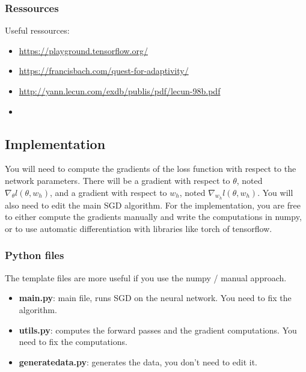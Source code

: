 \documentclass[
10pt, %
a4paper, %
oneside, %
headinclude,footinclude, %
BCOR5mm, %
]{scrartcl}
\begin{document}
\subsubsection{Ressources}%
\label{ssub:Ressources}

Useful ressources:
\begin{itemize}
\item 	\url{https://playground.tensorflow.org/}
\item \url{https://francisbach.com/quest-for-adaptivity/} 
    \item \url{http://yann.lecun.com/exdb/publis/pdf/lecun-98b.pdf} 
    \item \cite{LeCun2012}
\end{itemize}

\subsection{Implementation}%
\label{ssub:Implementation}

{\color{Blue}{Train neural networks with SGD (Stochastic gradient descent) with varying number $m$ of neurons in the (unique) hidden layer, including $m>n$ (where $n$ is the number of samples in the dataset) in order to observe the simplicity bias.}}

You will need to compute the gradients of the loss function with respect to the network parameters. There will be a gradient with respect to $\theta$, noted $
\nabla_{\theta}l(\theta, w_h)$, and a gradient with respect to $w_h$, noted $\nabla_{w_h}l(\theta, w_h)$. You will also need to edit the main SGD algorithm. For the implementation,  you are free to either compute the gradients manually and write the computations in numpy, or to use automatic differentiation with libraries like torch of tensorflow.

\subsubsection{Python files}%
\label{ssub:Python files}

The template files are more useful if you use the numpy / manual approach.

\begin{itemize}
    \item \textbf{main.py}: main file, runs SGD on the neural network. You need to fix the algorithm.
    \item \textbf{utils.py}: computes the forward passes and the gradient computations. You need to fix the computations.
    \item \textbf{generate\textunderscore data.py}: generates the data, you don't need to edit it.
\end{itemize}
\end{document}
